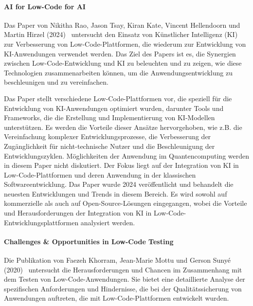 \paragraph{AI for Low-Code for AI}

Das Paper von Nikitha Rao, Jason Tsay, Kiran Kate, Vincent Hellendoorn und Martin Hirzel (2024)~\cite{rao2024} untersucht den Einsatz 
von Künstlicher Intelligenz (KI) zur Verbesserung von Low-Code-Plattformen, die wiederum zur Entwicklung von KI-Anwendungen 
verwendet werden. Das Ziel des Papers ist es, die Synergien zwischen Low-Code-Entwicklung und KI zu beleuchten und zu 
zeigen, wie diese Technologien zusammenarbeiten können, um die Anwendungsentwicklung zu beschleunigen und zu vereinfachen.

Das Paper stellt verschiedene Low-Code-Plattformen vor, die speziell für die Entwicklung von KI-Anwendungen optimiert wurden, 
darunter Tools und Frameworks, die die Erstellung und Implementierung von KI-Modellen unterstützen. 
Es werden die Vorteile dieser Ansätze hervorgehoben, wie z.B. die Vereinfachung komplexer Entwicklungsprozesse, 
die Verbesserung der Zugänglichkeit für nicht-technische Nutzer und die Beschleunigung der Entwicklungszyklen. 
Möglichkeiten der Anwendung im Quantencomputing werden in diesem Paper nicht diskutiert. 
Der Fokus liegt auf der Integration von KI in Low-Code-Plattformen und deren Anwendung in der klassischen Softwareentwicklung. 
Das Paper wurde 2024 veröffentlicht und behandelt die neuesten Entwicklungen und Trends in diesem Bereich. 
Es wird sowohl auf kommerzielle als auch auf Open-Source-Lösungen eingegangen, wobei die 
Vorteile und Herausforderungen der Integration von KI in Low-Code-Entwicklungsplattformen analysiert werden.

\paragraph{Challenges \& Opportunities in Low-Code Testing}

Die Publikation von Faezeh Khorram, Jean-Marie Mottu und Gerson Sunyé (2020)~\cite{Khorram_2020} untersucht die Herausforderungen und Chancen 
im Zusammenhang mit dem Testen von Low-Code-Anwendungen. Sie bietet eine detaillierte Analyse der spezifischen Anforderungen 
und Hindernisse, die bei der Qualitätssicherung von Anwendungen auftreten, die mit Low-Code-Plattformen entwickelt wurden.

